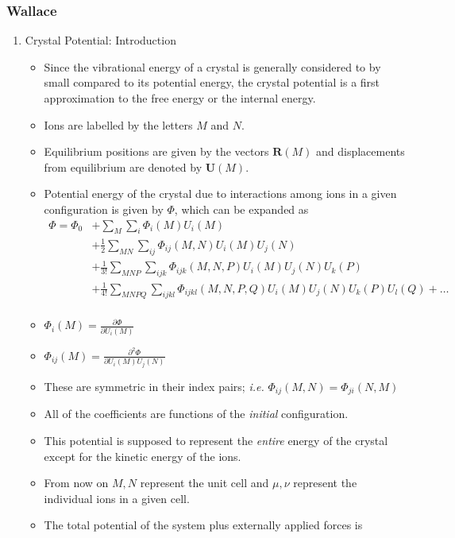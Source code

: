 \documentclass[11pt]{article}
\begin{document}
\subsubsection{Wallace}
\label{sec-2-3-1}
\begin{enumerate}
\item Crystal Potential: Introduction
\label{sec-2-3-1-1}
\begin{itemize}
\item Since the vibrational energy of a crystal is generally considered to by
small compared to its potential energy, the crystal potential is a first
approximation to the free energy or the internal energy.
\item Ions are labelled by the letters $M$ and $N$.
\item Equilibrium positions are given by the vectors $\mathbf{R}(M)$ and
displacements from equilibrium are denoted by $\mathbf{U}(M)$.
\item Potential energy of the crystal due to interactions among ions in a
given configuration is given by $\Phi$, which can be expanded as
\begin{align}
\Phi = \Phi_{0} &+ \sum_{M}\sum_{i} \Phi_{i}(M)U_{i}(M) \\ 
     &+ \frac{1}{2}\sum_{MN}\sum_{ij}\Phi_{ij}(M,N)U_i(M)U_j(N)\\ 
     &+ \frac{1}{3!} \sum_{MNP}\sum_{ijk}\Phi_{ijk}(M,N,P)U_{i}(M)U_{j}(N)U_{k}(P) \\
     &+ \frac{1}{4!} \sum_{MNPQ}\sum_{ijkl}\Phi_{ijkl}(M,N,P,Q)U_{i}(M)U_{j}(N)U_{k}(P)U_{l}(Q) + \dots \\
\end{align}
\item $\Phi_{i}(M) = \frac{\partial \Phi}{\partial U_{i}(M)}$
\item $\Phi_{ij}(M) = \frac{\partial^{2} \Phi}{\partial U_{i}(M)U_{j}(N)}$
\item These are symmetric in their index pairs; \emph{i.e.} $\Phi_{ij}(M,N) = \Phi_{ji}(N,M)$
\item All of the coefficients are functions of the \emph{initial} configuration.
\item This potential is supposed to represent the \emph{entire} energy of the crystal
except for the kinetic energy of the ions.
\item From now on $M, N$ represent the unit cell and $\mu, \nu$ represent the
individual ions in a given cell.
\item The total potential of the system plus externally applied forces is

\end{itemize}
\end{enumerate}
\end{document}
